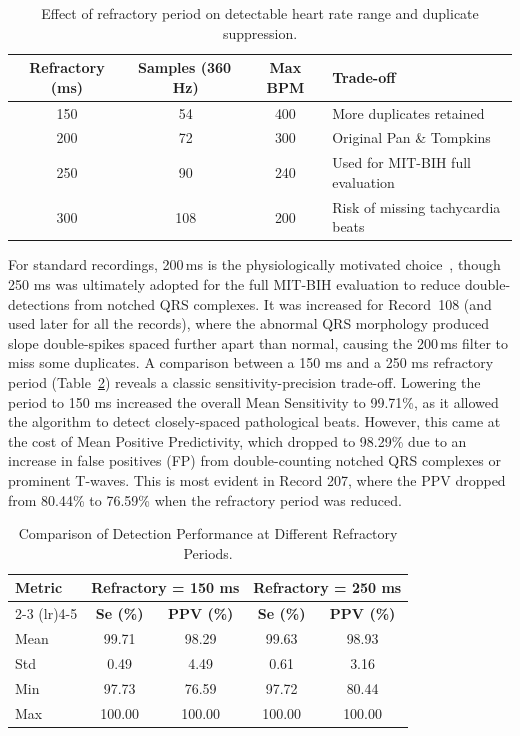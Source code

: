 \documentclass[11pt]{article}
\begin{document}
\begin{table}[htbp]
\centering
\caption{Effect of refractory period on detectable heart rate range and duplicate suppression.}
\label{tab:refractory}
\begin{tabular}{cccl}
\toprule
\textbf{Refractory (ms)} & \textbf{Samples (360\,Hz)} & 
\textbf{Max BPM} & \textbf{Trade-off} \\
\midrule
150 & 54  & 400 & More duplicates retained \\
200 & 72  & 300 & Original Pan \& Tompkins~\cite{pan_real-time_1985, xia_quick_2015} \\
250 & 90  & 240 & Used for MIT-BIH full evaluation \\
300 & 108 & 200 & Risk of missing tachycardia beats \\
\bottomrule
\end{tabular}
\end{table}

For standard recordings, 200\,ms is the physiologically motivated choice~\cite{pan_real-time_1985}, though 250 ms was ultimately adopted for the full MIT-BIH evaluation to reduce double-detections from notched QRS complexes. It was increased for Record~108 (and used later for all the records), where the abnormal QRS morphology produced slope double-spikes spaced further apart than normal, causing the 200\,ms filter to miss some duplicates. A comparison between a 150 ms and a 250 ms refractory period (Table~\ref{tab:comparison}) reveals a classic sensitivity-precision trade-off. Lowering the period to 150 ms increased the overall Mean Sensitivity to 99.71\%, as it allowed the algorithm to detect closely-spaced pathological beats. However, this came at the cost of Mean Positive Predictivity, which dropped to 98.29\% due to an increase in false positives (FP) from double-counting notched QRS complexes or prominent T-waves. This is most evident in Record 207, where the PPV dropped from 80.44\% to 76.59\% when the refractory period was reduced.


\begin{table}[ht]
\centering
\caption{Comparison of Detection Performance at Different Refractory Periods.}
\label{tab:comparison}
\begin{tabular}{lcccc}
\toprule
\textbf{Metric} & \multicolumn{2}{c}{\textbf{Refractory = 150 ms}} & \multicolumn{2}{c}{\textbf{Refractory = 250 ms}} \\
\cmidrule(lr){2-3} \cmidrule(lr){4-5}
& \textbf{Se (\%)} & \textbf{PPV (\%)} & \textbf{Se (\%)} & \textbf{PPV (\%)} \\
\midrule
Mean & 99.71 & 98.29 & 99.63 & 98.93 \\
Std  & 0.49  & 4.49  & 0.61  & 3.16  \\
Min  & 97.73 & 76.59 & 97.72 & 80.44 \\
Max  & 100.00 & 100.00 & 100.00 & 100.00 \\
\bottomrule
\end{tabular}
\end{table}
\end{document}
